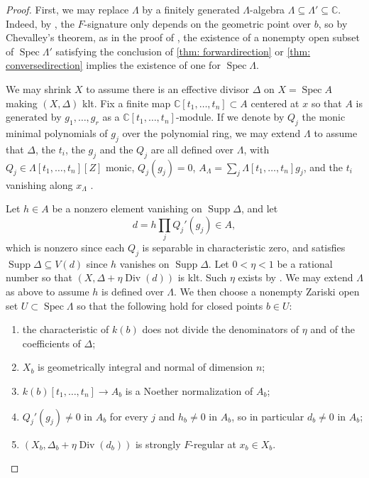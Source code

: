 \documentclass[11pt,leqno]{amsart}
\numberwithin{equation}{section}
\theoremstyle{definition}
\theoremstyle{remark}
\newcommand{\C}{\mathbb{C}}
\newcommand{\Spec}{\operatorname{Spec}}
\newcommand{\Div}{\operatorname{Div}}
\newcommand{\Supp}{\operatorname{Supp}}
\begin{document}
\begin{proof}
First, we may replace $\Lambda$ by a finitely generated $\Lambda$-algebra $\Lambda \subseteq \Lambda' \subseteq \C$. Indeed, by \cite[Theorem 5.6]{yao06}, the $F$-signature only depends on the geometric point over $b$, so by Chevalley's theorem, as in the proof of \cite[Chapter 6, Proposition 1.23]{SSbook}, the existence of a nonempty open subset of $\Spec \Lambda'$ satisfying the conclusion of \cref{thm: forwardirection} or \cref{thm: conversedirection} implies the existence of one for $\Spec \Lambda$. 

We may shrink $X$ to assume there is an effective divisor $\Delta$ on $X = \Spec A$ making $(X, \Delta)$ klt. Fix a finite map $\C[t_1, \ldots, t_n] \subset A$ centered at $x$ so that $A$ is generated by $g_1, \dots, g_r$ as a $\C[t_1, \dots, t_n]$-module. If we denote by $Q_j$ the monic minimal polynomials of $g_j$ over the polynomial ring, we may extend $\Lambda$ to assume that $\Delta$, the $t_i$, the $g_j$ and the $Q_j$ are all defined over $\Lambda$, with $Q_j \in \Lambda[t_1, \dots, t_n][Z]$ monic, $Q_j(g_j) = 0$, $A_\Lambda = \sum_j \Lambda[t_1, \dots, t_n]g_j$, and the $t_i$ vanishing along $x_\Lambda$ \cite[Chapter 6, Section 1.3 and Exercise 1.7]{SSbook}.


   Let $h \in A$ be a nonzero element vanishing on $\Supp \Delta$, and let $$d = h\prod_j Q_j'(g_j) \in A,$$ which is nonzero since each $Q_j$ is separable in characteristic zero, and satisfies $\operatorname{Supp}\Delta\subseteq V(d)$ since $h$ vanishes on $\Supp \Delta$. Let $0 < \eta < 1$ be a rational number so that $(X, \Delta + \eta\Div(d))$ is klt. Such $\eta$ exists by \cite[Corollary 2.35(2)]{kollarmori}. We may extend $\Lambda$ as above to assume $h$ is defined over $\Lambda$. We then choose a nonempty Zariski open set $U \subset \Spec \Lambda$ so that the following hold for closed points $b \in U$: \begin{enumerate}[ref=(\arabic*)]
\item\label{cond: fwdchar} the characteristic of $k(b)$ does not divide the denominators of $\eta$ and of the coefficients of $\Delta$;
   \item\label{cond: fwdnormal} $X_b$ is geometrically integral and normal of dimension $n$;
\item\label{cond: fwdnoether} $k(b)[t_1, \dots, t_n] \to A_b$ is a Noether normalization of $A_b$;
\item\label{cond: fwdnonzero} $Q_j'(g_j) \neq 0$ in $A_b$ for every $j$ and $h_b \neq 0$ in $A_b$, so in particular $d_b \neq 0$ in $A_b$;
\item\label{cond: fwdsfr} $(X_b, \Delta_b + \eta \Div(d_b))$ is strongly $F$-regular at $x_b \in X_b$.
\end{enumerate}



\end{proof}
\end{document}
